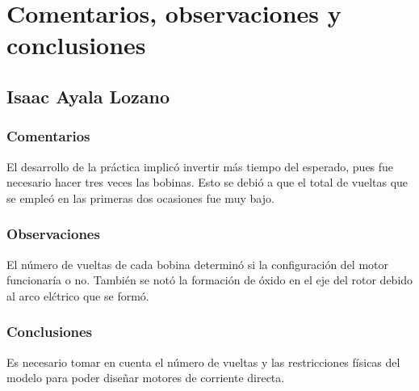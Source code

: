 \section{Comentarios, observaciones y conclusiones}
\subsection{Isaac Ayala Lozano}
\subsubsection{Comentarios}
El desarrollo de la pr\'actica implic\'o invertir m\'as tiempo del esperado, pues fue necesario hacer tres veces las bobinas.
Esto se debi\'o a que el total de vueltas que se emple\'o en las primeras dos ocasiones fue muy bajo.

\subsubsection{Observaciones}
El n\'umero de vueltas de cada bobina determin\'o si la configuraci\'on del motor funcionar\'ia o no. Tambi\'en se not\'o 
la formaci\'on de \'oxido en el eje del rotor debido al arco el\'ctrico que se form\'o.

\subsubsection{Conclusiones}
Es necesario tomar en cuenta el n\'umero de vueltas y las restricciones f\'isicas del modelo para poder dise\~nar motores 
de corriente directa.
